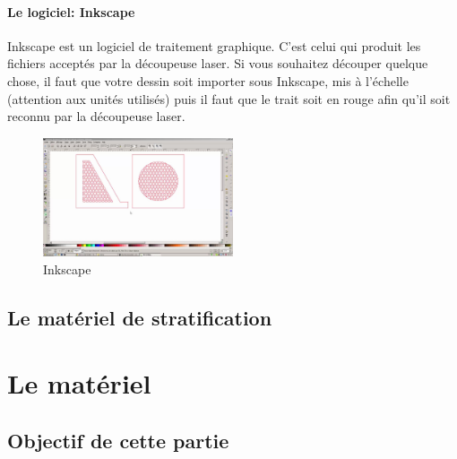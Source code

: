 \documentclass[a4paper, 11pt]{report}
\begin{document}
\subsection{Le logiciel: Inkscape}
Inkscape est un logiciel de traitement graphique. C'est celui qui produit les fichiers acceptés par la découpeuse laser. Si vous souhaitez découper quelque chose, il faut que votre dessin soit importer sous Inkscape, mis à l'échelle (attention aux unités utilisés) puis il faut que le trait soit en rouge afin qu'il soit reconnu par la découpeuse laser.

\begin{figure}[h]
	\begin{center}
		\includegraphics[width=0.5\textwidth]{images/inkscape.jpg}
		\caption{Inkscape}
	\end{center}
\end{figure}

\chapter{Le matériel de stratification}

\part{Le matériel}

\chapter{Objectif de cette partie}
\end{document}
